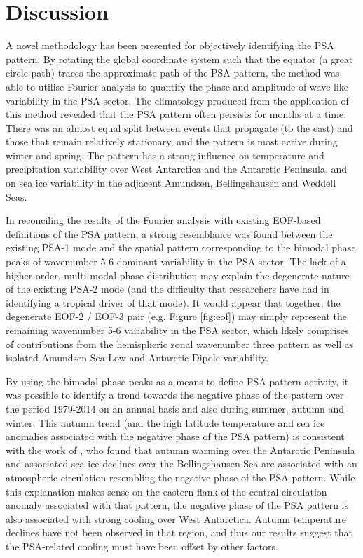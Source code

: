 
\section{Discussion}

A novel methodology has been presented for objectively identifying the PSA pattern. By rotating the global coordinate system such that the equator (a great circle path) traces the approximate path of the PSA pattern, the method was able to utilise Fourier analysis to quantify the phase and amplitude of wave-like variability in the PSA sector. The climatology produced from the application of this method revealed that the PSA pattern often persists for months at a time. There was an almost equal split between events that propagate (to the east) and those that remain relatively stationary, and the pattern is most active during winter and spring. The pattern has a strong influence on temperature and precipitation variability over West Antarctica and the Antarctic Peninsula, and on sea ice variability in the adjacent Amundsen, Bellingshausen and Weddell Seas. 

In reconciling the results of the Fourier analysis with existing EOF-based definitions of the PSA pattern, a strong resemblance was found between the existing PSA-1 mode and the spatial pattern corresponding to the bimodal phase peaks of wavenumber 5-6 dominant variability in the PSA sector. The lack of a higher-order, multi-modal phase distribution may explain the degenerate nature of the existing PSA-2 mode (and the difficulty that researchers have had in identifying a tropical driver of that mode). It would appear that together, the degenerate EOF-2 / EOF-3 pair (e.g. Figure \ref{fig:eof}) may simply represent the remaining wavenumber 5-6 variability in the PSA sector, which likely comprises of contributions from the hemispheric zonal wavenumber three pattern as well as isolated Amundsen Sea Low and Antarctic Dipole variability.    

By using the bimodal phase peaks as a means to define PSA pattern activity, it was possible to identify a trend towards the negative phase of the pattern over the period 1979-2014 on an annual basis and also during summer, autumn and winter. This autumn trend (and the high latitude temperature and sea ice anomalies associated with the negative phase of the PSA pattern) is consistent with the work of \citet{Ding2013}, who found that autumn warming over the Antarctic Peninsula and associated sea ice declines over the Bellingshausen Sea are associated with an atmospheric circulation resembling the negative phase of the PSA pattern. While this explanation makes sense on the eastern flank of the central circulation anomaly associated with that pattern, the negative phase of the PSA pattern is also associated with strong cooling over West Antarctica. Autumn temperature declines have not been observed in that region, and thus our results suggest that the PSA-related cooling must have been offset by other factors. 

